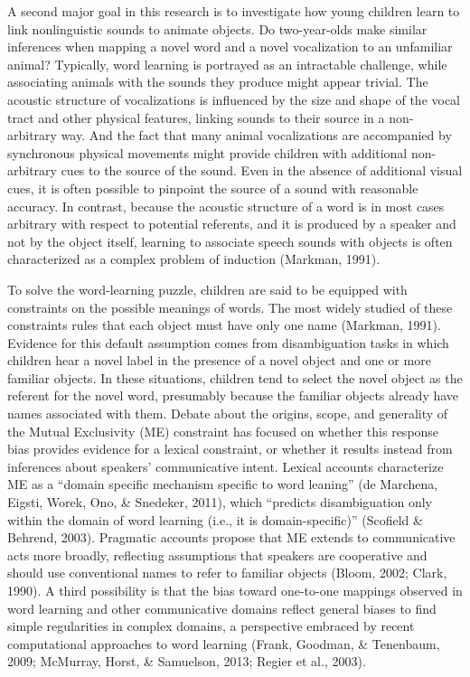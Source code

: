 \documentclass[english,floatsintext,man]{apa6}
\theoremstyle{definition}
\theoremstyle{definition}
\theoremstyle{definition}
\theoremstyle{remark}
\begin{document}
A second major goal in this research is to investigate how young
children learn to link nonlinguistic sounds to animate objects. Do
two-year-olds make similar inferences when mapping a novel word and a
novel vocalization to an unfamiliar animal? Typically, word learning is
portrayed as an intractable challenge, while associating animals with
the sounds they produce might appear trivial. The acoustic structure of
vocalizations is influenced by the size and shape of the vocal tract and
other physical features, linking sounds to their source in a
non-arbitrary way. And the fact that many animal vocalizations are
accompanied by synchronous physical movements might provide children
with additional non-arbitrary cues to the source of the sound. Even in
the absence of additional visual cues, it is often possible to pinpoint
the source of a sound with reasonable accuracy. In contrast, because the
acoustic structure of a word is in most cases arbitrary with respect to
potential referents, and it is produced by a speaker and not by the
object itself, learning to associate speech sounds with objects is often
characterized as a complex problem of induction (Markman, 1991).

To solve the word-learning puzzle, children are said to be equipped with
constraints on the possible meanings of words. The most widely studied
of these constraints rules that each object must have only one name
(Markman, 1991). Evidence for this default assumption comes from
disambiguation tasks in which children hear a novel label in the
presence of a novel object and one or more familiar objects. In these
situations, children tend to select the novel object as the referent for
the novel word, presumably because the familiar objects already have
names associated with them. Debate about the origins, scope, and
generality of the Mutual Exclusivity (ME) constraint has focused on
whether this response bias provides evidence for a lexical constraint,
or whether it results instead from inferences about speakers'
communicative intent. Lexical accounts characterize ME as a
\enquote{domain specific mechanism specific to word leaning} (de
Marchena, Eigsti, Worek, Ono, \& Snedeker, 2011), which
\enquote{predicts disambiguation only within the domain of word learning
(i.e., it is domain-specific)} (Scofield \& Behrend, 2003). Pragmatic
accounts propose that ME extends to communicative acts more broadly,
reflecting assumptions that speakers are cooperative and should use
conventional names to refer to familiar objects (Bloom, 2002; Clark,
1990). A third possibility is that the bias toward one-to-one mappings
observed in word learning and other communicative domains reflect
general biases to find simple regularities in complex domains, a
perspective embraced by recent computational approaches to word learning
(Frank, Goodman, \& Tenenbaum, 2009; McMurray, Horst, \& Samuelson,
2013; Regier et al., 2003).
\end{document}
